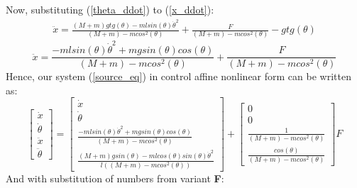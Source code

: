 \documentclass[a4paper,12pt]{article}
\begin{document}
    Now, substituting (\ref{theta_ddot}) to (\ref{x_ddot}):
    \begin{gather*}
        \ddot x = 
        \frac
        {(M+m)gtg(\theta) - mlsin(\theta)\dot \theta^2}
        {(M+m) - mcos^2(\theta)}
        +
        \frac
        {F}
        {(M+m) - mcos^2(\theta)}
        -
        gtg(\theta)
    \end{gather*}
    \begin{equation}
        \ddot x = 
        \frac
        {- mlsin(\theta)\dot \theta^2 + mgsin(\theta)cos(\theta)}
        {(M+m) - mcos^2(\theta)}
        +
        \frac
        {F}
        {(M+m) - mcos^2(\theta)}
    \end{equation}
    Hence, our system (\ref{source_eq}) in control affine nonlinear form can be
    written as:
    \begin{equation}
        \begin{bmatrix}
            \dot x\\
            \dot \theta\\
            \ddot x\\
            \ddot \theta    
        \end{bmatrix}
        =
        \begin{bmatrix}
            \dot x\\
            \dot \theta\\
            \frac
            {- mlsin(\theta)\dot \theta^2 + mgsin(\theta)cos(\theta)}
            {(M+m) - mcos^2(\theta)}\\
            \frac
            {(M+m)gsin(\theta) - mlcos(\theta)sin(\theta)\dot \theta^2}
            {l((M+m) - mcos^2(\theta))}
        \end{bmatrix}
        +
        \begin{bmatrix}
            0\\0\\
            \frac
            {1}
            {(M+m) - mcos^2(\theta)}\\
            \frac
            {cos(\theta)}
            {(M+m) - mcos^2(\theta)}
        \end{bmatrix}
        F
    \end{equation}
    And with substitution of numbers from variant \textbf{F}:
\end{document}
